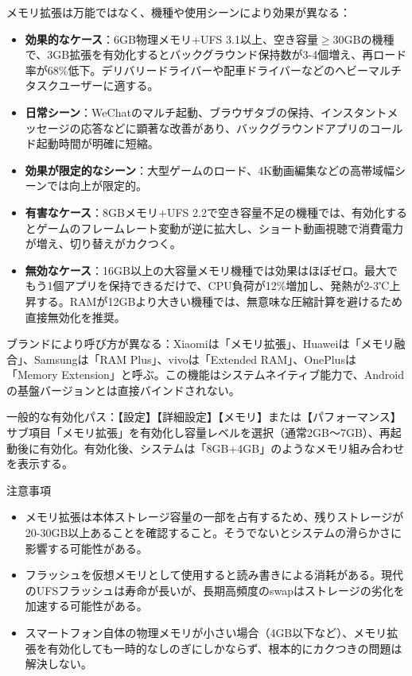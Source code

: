 
メモリ拡張は万能ではなく、機種や使用シーンにより効果が異なる：

\begin{itemize}
  \item \textbf{効果的なケース}：6GB物理メモリ+UFS 3.1以上、空き容量$\geq$30GBの機種で、3GB拡張を有効化するとバックグラウンド保持数が3-4個増え、再ロード率が68\%低下。デリバリードライバーや配車ドライバーなどのヘビーマルチタスクユーザーに適する。
  \item \textbf{日常シーン}：WeChatのマルチ起動、ブラウザタブの保持、インスタントメッセージの応答などに顕著な改善があり、バックグラウンドアプリのコールド起動時間が明確に短縮。
  \item \textbf{効果が限定的なシーン}：大型ゲームのロード、4K動画編集などの高帯域幅シーンでは向上が限定的。
  \item \textbf{有害なケース}：8GBメモリ+UFS 2.2で空き容量不足の機種では、有効化するとゲームのフレームレート変動が逆に拡大し、ショート動画視聴で消費電力が増え、切り替えがカクつく。
  \item \textbf{無効なケース}：16GB以上の大容量メモリ機種では効果はほぼゼロ。最大でもう1個アプリを保持できるだけで、CPU負荷が12\%増加し、発熱が2-3℃上昇する。RAMが12GBより大きい機種では、無意味な圧縮計算を避けるため直接無効化を推奨。
\end{itemize}


ブランドにより呼び方が異なる：Xiaomiは「メモリ拡張」、Huaweiは「メモリ融合」、Samsungは「RAM Plus」、vivoは「Extended RAM」、OnePlusは「Memory Extension」と呼ぶ。この機能はシステムネイティブ能力で、Androidの基盤バージョンとは直接バインドされない。

一般的な有効化パス：【設定】【詳細設定】【メモリ】または【パフォーマンス】サブ項目「メモリ拡張」を有効化し容量レベルを選択（通常2GB〜7GB）、再起動後に有効化。有効化後、システムは「8GB+4GB」のようなメモリ組み合わせを表示する。

\begin{tcbwarn}{注意事項}
\begin{itemize}
  \item メモリ拡張は本体ストレージ容量の一部を占有するため、残りストレージが20-30GB以上あることを確認すること。そうでないとシステムの滑らかさに影響する可能性がある。
  \item フラッシュを仮想メモリとして使用すると読み書きによる消耗がある。現代のUFSフラッシュは寿命が長いが、長期高頻度のswapはストレージの劣化を加速する可能性がある。
  \item スマートフォン自体の物理メモリが小さい場合（4GB以下など）、メモリ拡張を有効化しても一時的なしのぎにしかならず、根本的にカクつきの問題は解決しない。
\end{itemize}

\end{tcbwarn}

